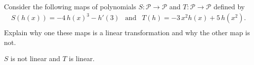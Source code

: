 
\begin{exerciseStatement}


Consider the following maps of polynomials \(S:\mathcal{P}\rightarrow\mathcal{P}\) and \(T:\mathcal{P}\rightarrow\mathcal{P}\) defined by 
\begin{align*} S(h(x))= -4 \, h\left(x\right)^{3} - h'\left(3\right)  & \text{and} & T(h)= -3 \, x^{2} h\left(x\right) + 5 \, h\left(x^{2}\right) . \\ \end{align*}
             Explain why one these maps is a linear transformation and why the other map is not. 


\end{exerciseStatement}
    
\begin{exerciseAnswer} 


\(S\) is not linear and \(T\) is linear.


\end{exerciseAnswer}
    
